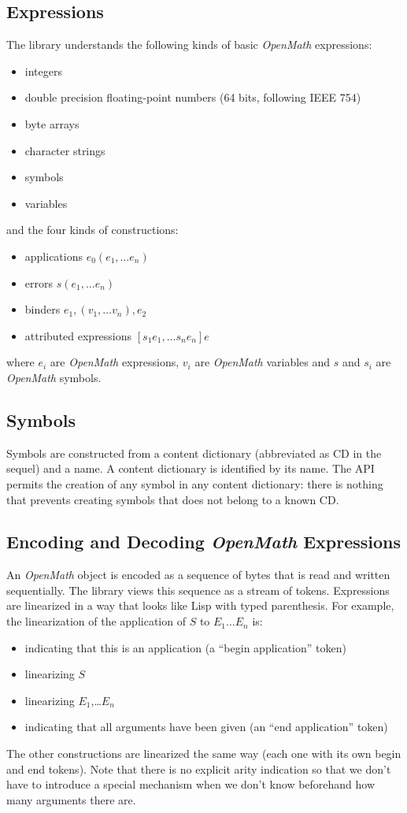 \documentclass{article}
\newcommand{\OM}{{\sl OpenMath}}
\begin{document}
\subsection{Expressions}

The library understands the following kinds of basic {\OM} expressions:
\begin{itemize} 
\item integers
\item double precision  floating-point numbers (64 bits, following IEEE 754)
\item byte arrays
\item character strings
\item symbols
\item variables
\end{itemize} 
and the four kinds of constructions: 
\begin{itemize} 
\item applications $e_0(e_1, \ldots e_n)$
\item errors $s(e_1, \ldots e_n)$
\item binders $e_1, (v_1, \ldots v_n), e_2 $
\item attributed expressions $[s_1 e_1, \ldots s_n e_n] e$
\end{itemize} 
where $e_i$ are {\OM} expressions, $v_i$ are {\OM} variables and $s$ and
$s_i$ are {\OM} symbols. 

\subsection{Symbols}

Symbols are constructed from a content dictionary (abbreviated as CD in the
sequel) and a name.
A content dictionary is identified by its name. 
The API permits the creation of any symbol in any content dictionary:
there is nothing that prevents creating symbols that does not belong to a
known CD.

\subsection{Encoding and Decoding {\OM} Expressions}

An {\OM} object is encoded as a sequence of bytes that is read and written
sequentially. The library views this sequence as a stream of tokens.
Expressions are linearized in a way that looks like Lisp with typed
parenthesis. For example, the linearization of the application of $S$ to
$E_1\ldots E_n$ is: 
\begin{itemize} 
\item indicating that this is an application (a ``begin application'' token)
\item linearizing $S$
\item linearizing $E_1$,\ldots $E_n$
\item indicating that all arguments have been given (an ``end application''
token) 
\end{itemize} 
The other constructions are linearized the same way (each one with its own
begin and end tokens). 
Note that there is no explicit arity indication so that we don't have to
introduce a special mechanism when we don't know beforehand how many
arguments there are.
\end{document}
